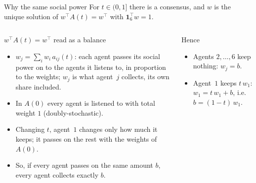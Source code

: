 \documentclass[10pt, aspectratio=169]{beamer}
\newcommand{\compactblocks}{\setbeamerfont{block title}{size=\small}}
\begin{document}
\begin{frame}[label=m-fdg-why]{Why the same social power}
  \compactblocks
  \footnotesize
  For $t \in (0,1]$ there is a consensus, and $w$ is the unique solution of
  $w^\top A(t) = w^\top$ with $\mathbf{1}_6^\top w = 1$.
  \begin{columns}[T]
      \begin{block}{$w^\top A(t) = w^\top$ read as a balance}
        \footnotesize
        \begin{itemize}
          \item $w_j = \sum_i w_i\, a_{ij}(t)$: each agent passes its social power on to
                the agents it listens to, in proportion to the weights; $w_j$ is what
                agent~$j$ collects, its own share included.
          \item In $A(0)$ every agent is listened to with total weight $1$
                (doubly-stochastic).
          \item Changing $t$, agent~$1$ changes only how much it keeps; it passes on the
                rest with the weights of $A(0)$.
          \item So, if every agent passes on the same amount $b$, every agent collects
                exactly $b$.
        \end{itemize}
      \end{block}
      \begin{block}{Hence}
        \footnotesize
        \begin{itemize}
          \item Agents $2, \dots, 6$ keep nothing: $w_j = b$.
          \item Agent~$1$ keeps $t\,w_1$: $w_1 = t\,w_1 + b$, i.e.\ $b = (1-t)\,w_1$.

\end{itemize}
\end{block}
\end{columns}
\end{frame}
\end{document}
